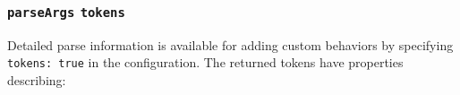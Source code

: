 \begin{Shaded}
\begin{Highlighting}[]
\OperatorTok{=} \NormalTok{(}\NormalTok{)}\OperatorTok{;}
\OperatorTok{=}\NormalTok{ [}\OperatorTok{,} \OperatorTok{,} \NormalTok{]}\OperatorTok{;}
\OperatorTok{=}\NormalTok{ \{}
  \OperatorTok{:}\NormalTok{ \{}
    \OperatorTok{:} \OperatorTok{,}
    \OperatorTok{:} \OperatorTok{,}
\NormalTok{  \}}\OperatorTok{,}
  \OperatorTok{:}\NormalTok{ \{}
    \OperatorTok{:} \OperatorTok{,}
\NormalTok{  \}}\OperatorTok{,}
\NormalTok{\}}\OperatorTok{;}
\NormalTok{ \{}
\OperatorTok{,}
\OperatorTok{,}
\NormalTok{\} }\OperatorTok{=} \OperatorTok{,}\OperatorTok{;}
\OperatorTok{,}\OperatorTok{;}
\end{Highlighting}
\end{Shaded}

\subsubsection{\texorpdfstring{\texttt{parseArgs}
\texttt{tokens}}{parseArgs tokens}}\label{parseargs-tokens}

Detailed parse information is available for adding custom behaviors by
specifying \texttt{tokens:\ true} in the configuration. The returned
tokens have properties describing:

